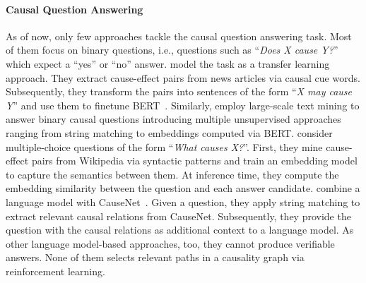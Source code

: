 \paragraph{Causal Question Answering}
As of now, only few approaches tackle the causal question answering task. Most of them focus on binary questions, i.e., questions such as ``\textit{Does X cause Y?}'' which expect a ``yes'' or ``no'' answer. 
\citet{KayeshCausalTransfer2020} model the task as a transfer learning approach. They extract cause-effect pairs from news articles via causal cue words. Subsequently, they transform the pairs into sentences of the form ``\textit{X may cause Y}'' and use them to finetune BERT~\cite{DevlinBert2019}. Similarly, \citet{HassanzadeshCausalQA2019} employ large-scale text mining to answer binary causal questions introducing multiple unsupervised approaches ranging from string matching to embeddings computed via BERT. \citet{SharpCausalQAEmbeddings2016} consider multiple-choice questions of the form ``\textit{What causes X?}''. First, they mine cause-effect pairs from Wikipedia via syntactic patterns and train an embedding model to capture the semantics between them. At inference time, they compute the embedding similarity between the question and each answer candidate. \citet{DalalCausalQAEnhancing2021, DalalCausalQAISWC2021}
combine a language model with CauseNet~\cite{Heindorf2020Causenet}.
Given a question, they apply string matching to extract relevant causal relations from CauseNet. Subsequently, they provide the question with the causal relations as additional context to a language model. As other language model-based approaches, too, they cannot produce verifiable answers. None of them selects relevant paths in a causality graph via reinforcement learning.

